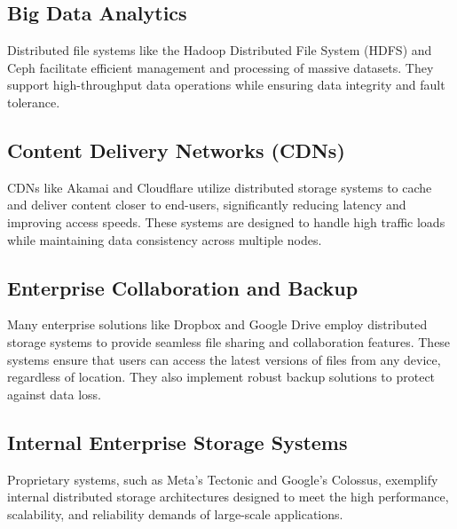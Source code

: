 \subsection{Big Data Analytics}
Distributed file systems like the Hadoop Distributed File System (HDFS)\cite{hdfs} and Ceph\cite{ceph} facilitate efficient management and processing of massive datasets. They support high-throughput data operations while ensuring data integrity and fault tolerance.

\subsection{Content Delivery Networks (CDNs)}
CDNs like Akamai\cite{akamai} and Cloudflare\cite{cloudflare} utilize distributed storage systems to cache and deliver content closer to end-users, significantly reducing latency and improving access speeds. These systems are designed to handle high traffic loads while maintaining data consistency across multiple nodes.

\subsection{Enterprise Collaboration and Backup}
Many enterprise solutions like Dropbox\cite{dropbox} and Google Drive\cite{google_drive} employ distributed storage systems to provide seamless file sharing and collaboration features. These systems ensure that users can access the latest versions of files from any device, regardless of location. They also implement robust backup solutions to protect against data loss.

\subsection{Internal Enterprise Storage Systems}
Proprietary systems, such as Meta's Tectonic\cite{tectonic} and Google's Colossus\cite{colossus}, exemplify internal distributed storage architectures designed to meet the high performance, scalability, and reliability demands of large-scale applications.
